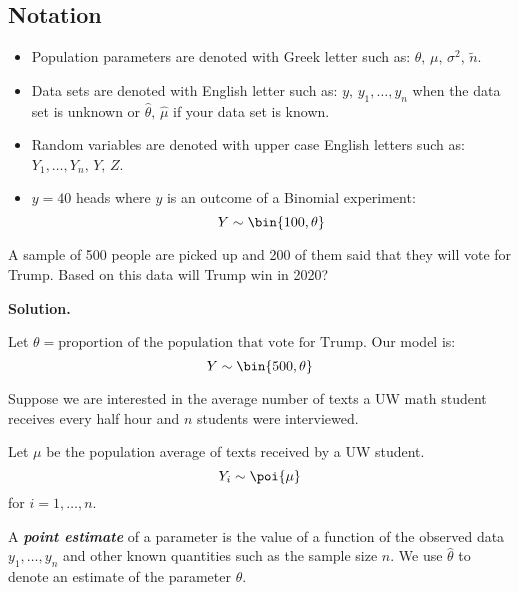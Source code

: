 \subsection*{Notation}
\begin{itemize}
    \item Population parameters are denoted with Greek letter such as:
          $ \theta,\,\mu,\,\sigma^2,\,\tilde{n} $.
    \item Data sets are denoted with English letter such as:
          $ y,\,y_1,\ldots ,y_n $ when the data set is unknown or
          $ \hat{\theta},\,\hat{\mu} $ if your data set is known.
    \item Random variables are denoted with upper case English letters such as:
          $ Y_1,\ldots ,Y_n,\, Y,\, Z $.
    \item $ y=40 $ heads where $ y $ is an outcome of a Binomial experiment:
          \[ Y \sim \bin{100,\theta} \]
\end{itemize}


\begin{Example}{}{}
    A sample of 500 people
    are picked up and 200 of them said that they will vote for Trump. Based
    on this data will Trump win in 2020?

    \textbf{Solution.}

    Let $ \theta=\text{proportion of the population that vote for Trump} $. Our model is:
    \[ Y \sim \bin{500,\theta} \]
\end{Example}



\begin{Example}{}{}
    Suppose we are interested in the average number of texts a UW math student
    receives every half hour and $ n $ students were interviewed.

    \vspace{1mm}

    Let $ \mu $ be the population average of texts received by a UW student.
    \[ Y_i \sim \poi{\mu} \]
    for $ i=1,\ldots ,n $.
\end{Example}



\begin{Definition}{}{}
    A \textbf{\emph{point estimate}} of a parameter is the value of a function
    of the observed data $ y_1,\ldots ,y_n $ and other known quantities such as
    the sample size $ n $. We use $ \hat{\theta} $ to denote an estimate
    of the parameter $ \theta $.
\end{Definition}



